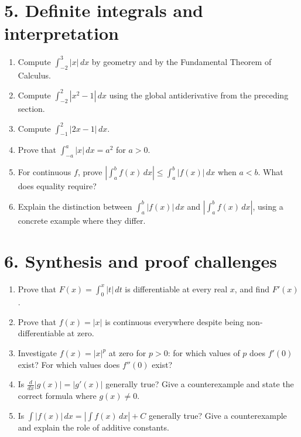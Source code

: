 \documentclass{self-check}
\begin{document}
\section*{5. Definite integrals and interpretation}
\begin{enumerate}[resume]
\item Compute $\displaystyle\int_{-2}^{3}|x|\,dx$ by geometry and by the Fundamental Theorem of Calculus.
\item Compute $\displaystyle\int_{-2}^{2}|x^2-1|\,dx$ using the global antiderivative from the preceding section.
\item Compute $\displaystyle\int_{-1}^{2}|2x-1|\,dx$.
\item Prove that $\displaystyle\int_{-a}^{a}|x|\,dx=a^2$ for $a>0$.
\item For continuous $f$, prove $\displaystyle\left|\int_a^b f(x)\,dx\right|\le\int_a^b|f(x)|\,dx$ when $a<b$. What does equality require?
\item Explain the distinction between $\displaystyle\int_a^b|f(x)|\,dx$ and $\displaystyle\left|\int_a^b f(x)\,dx\right|$, using a concrete example where they differ.
\end{enumerate}

\section*{6. Synthesis and proof challenges}
\begin{enumerate}[resume]
\item Prove that $F(x)=\int_0^x|t|\,dt$ is differentiable at every real $x$, and find $F'(x)$.
\item Prove that $f(x)=|x|$ is continuous everywhere despite being non-differentiable at zero.
\item Investigate $f(x)=|x|^p$ at zero for $p>0$: for which values of $p$ does $f'(0)$ exist? For which values does $f''(0)$ exist?
\item Is $\displaystyle\frac{d}{dx}|g(x)|=\left|g'(x)\right|$ generally true? Give a counterexample and state the correct formula where $g(x)\ne0$.
\item Is $\displaystyle\int|f(x)|\,dx=\left|\int f(x)\,dx\right|+C$ generally true? Give a counterexample and explain the role of additive constants.
\end{enumerate}
\end{document}
